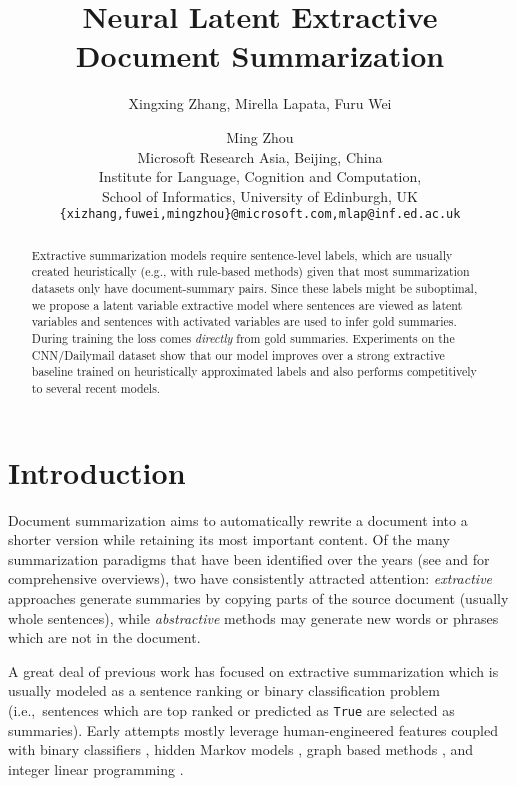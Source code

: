 \documentclass[11pt,a4paper]{article}
\title{Neural Latent Extractive Document Summarization}
\author{Xingxing Zhang, Mirella Lapata, Furu Wei \and Ming Zhou \\
	Microsoft Research Asia, Beijing, China \\
	Institute for Language, Cognition and Computation, \\ School of Informatics, University of Edinburgh, UK \\ 
	{\tt \{xizhang,fuwei,mingzhou\}@microsoft.com,mlap@inf.ed.ac.uk} }
\date{}
\begin{document}
\maketitle
\begin{abstract}
  Extractive summarization models require sentence-level labels, which
  are usually created heuristically (e.g., with rule-based methods)
  given that most summarization datasets only have document-summary
  pairs. Since these labels might be suboptimal, we propose a latent
  variable extractive model where sentences are viewed as latent
  variables and sentences with activated variables are used to infer
  gold summaries. During training the loss comes \emph{directly} from
  gold summaries. Experiments on the CNN/Dailymail dataset show that
  our model improves over a strong extractive baseline trained on
  heuristically approximated labels and also performs competitively to
  several recent models.
\end{abstract}


\section{Introduction}

Document summarization aims to automatically rewrite a document into a
shorter version while retaining its most important content.  Of the
many summarization paradigms that have been identified over the years
(see \citealt{Mani:01} and \citealt{Nenkova:McKeown:2011} for
comprehensive overviews), two have consistently attracted attention:
\emph{extractive} approaches generate summaries by {copying} parts of
the source document (usually whole sentences), while
\emph{abstractive} methods may generate new words or phrases which are not
in the document.

A great deal of previous work has focused on extractive summarization
which is usually modeled as a sentence ranking or binary
classification problem (i.e.,~sentences which are top ranked or
predicted as {\tt True} are selected as summaries). Early attempts
mostly leverage human-engineered features
\cite{filatova:2004:acl:workshop} coupled with binary classifiers
\cite{kupiec:1995:sigir}, hidden Markov models
\cite{conroy:2001:sigir}, graph based methods
\cite{mihalcea:2005:acl}, and integer linear programming
\cite{woodsend:2010:acl}.
\end{document}

